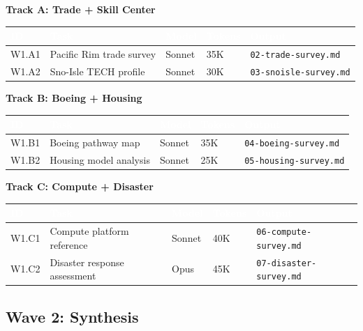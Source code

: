 \documentclass[11pt,letterpaper]{article}
\newcommand{\tableheader}[1]{\textbf{\sffamily\textcolor{white}{#1}}}
\begin{document}
\textbf{Track A: Trade + Skill Center}

\begin{center}
\begin{tabularx}{\textwidth}{C{0.8cm}L{3cm}C{1.2cm}C{1.2cm}X}
\toprule
{}
\tableheader{ID} & \tableheader{Task} & \tableheader{Model} & \tableheader{Tokens} & \tableheader{Output} \\
\midrule
W1.A1 & Pacific Rim trade survey & Sonnet & 35K & \texttt{02-trade-survey.md} \\
W1.A2 & Sno-Isle TECH profile & Sonnet & 30K & \texttt{03-snoisle-survey.md} \\
\bottomrule
\end{tabularx}
\end{center}

\textbf{Track B: Boeing + Housing}

\begin{center}
\begin{tabularx}{\textwidth}{C{0.8cm}L{3cm}C{1.2cm}C{1.2cm}X}
\toprule
{}
\tableheader{ID} & \tableheader{Task} & \tableheader{Model} & \tableheader{Tokens} & \tableheader{Output} \\
\midrule
W1.B1 & Boeing pathway map & Sonnet & 35K & \texttt{04-boeing-survey.md} \\
W1.B2 & Housing model analysis & Sonnet & 25K & \texttt{05-housing-survey.md} \\
\bottomrule
\end{tabularx}
\end{center}

\textbf{Track C: Compute + Disaster}

\begin{center}
\begin{tabularx}{\textwidth}{C{0.8cm}L{3cm}C{1.2cm}C{1.2cm}X}
\toprule
{}
\tableheader{ID} & \tableheader{Task} & \tableheader{Model} & \tableheader{Tokens} & \tableheader{Output} \\
\midrule
W1.C1 & Compute platform reference & Sonnet & 40K & \texttt{06-compute-survey.md} \\
W1.C2 & Disaster response assessment & Opus & 45K & \texttt{07-disaster-survey.md} \\
\bottomrule
\end{tabularx}
\end{center}

\subsection{Wave 2: Synthesis}
\end{document}
